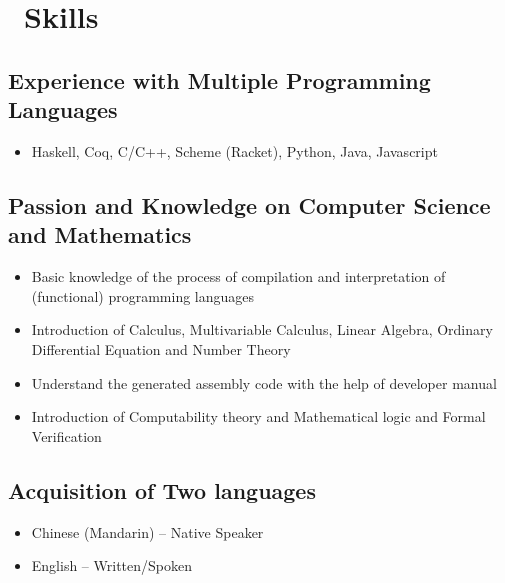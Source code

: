 \documentclass{resume}
\begin{document}
\section{\faCogs\ Skills}
\subsection{\textbf{Experience with Multiple Programming Languages}}
\begin{itemize}
 \item Haskell, Coq, C/C++, Scheme (Racket), Python, Java, Javascript
\end{itemize}
\subsection{\textbf{Passion and Knowledge on Computer Science and Mathematics}}
\begin{itemize}
\item Basic knowledge of the process of compilation and interpretation of (functional) programming languages
\item Introduction of Calculus, Multivariable Calculus, Linear Algebra, Ordinary Differential Equation and Number Theory
\item Understand the generated assembly code with the help of developer manual
\item Introduction of Computability theory and Mathematical logic and Formal Verification
\end{itemize}
\subsection{\textbf{Acquisition of Two languages}}
\begin{itemize}
\item Chinese (Mandarin) – Native Speaker
\item English – Written/Spoken
\end{itemize}

 
\end{document}
